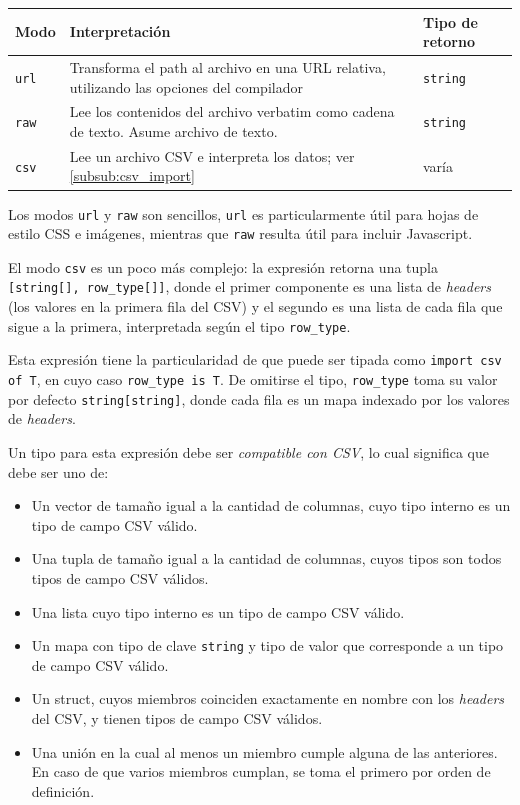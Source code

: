 \begin{table}[H]
\centering
\begin{tabularx}{\linewidth}{|l|>{\raggedright\arraybackslash}X|l|}
\hline
\textbf{Modo} & \textbf{Interpretación}                                                                   & \textbf{Tipo de retorno} \\ \hline
\texttt{url}  & Transforma el path al archivo en una URL relativa, utilizando las opciones del compilador & \texttt{string}          \\ \hline
\texttt{raw}  & Lee los contenidos del archivo verbatim como cadena de texto. Asume archivo de texto.     & \texttt{string}          \\ \hline
\texttt{csv}  & Lee un archivo CSV e interpreta los datos; ver \autoref{subsub:csv_import}                & varía                    \\ \hline
\end{tabularx}
\end{table}

Los modos \texttt{url} y \texttt{raw} son sencillos, \texttt{url} es particularmente útil para hojas de estilo CSS e imágenes, mientras que \texttt{raw} resulta útil para incluir Javascript.

El modo \texttt{csv} es un poco más complejo: la expresión retorna una tupla \texttt{[string[], row\_type[]]}, donde el primer componente es una lista de \textit{headers} (los valores en la primera fila del CSV) y el segundo es una lista de cada fila que sigue a la primera, interpretada según el tipo \texttt{row\_type}.

Esta expresión tiene la particularidad de que puede ser tipada como \texttt{import csv of T}, en cuyo caso \texttt{row\_type is T}. De omitirse el tipo, \texttt{row\_type} toma su valor por defecto \texttt{string[string]}, donde cada fila es un mapa indexado por los valores de \textit{headers}.

Un tipo para esta expresión debe ser \textit{compatible con CSV}, lo cual significa que debe ser uno de:

\begin{itemize}
	\item Un vector de tamaño igual a la cantidad de columnas, cuyo tipo interno es un tipo de campo CSV válido.
	\item Una tupla de tamaño igual a la cantidad de columnas, cuyos tipos son todos tipos de campo CSV válidos.
	\item Una lista cuyo tipo interno es un tipo de campo CSV válido.
	\item Un mapa con tipo de clave \texttt{string} y tipo de valor que corresponde a un tipo de campo CSV válido.
	\item Un struct, cuyos miembros coinciden exactamente en nombre con los \textit{headers} del CSV, y tienen tipos de campo CSV válidos.
	\item Una unión en la cual al menos un miembro cumple alguna de las anteriores. En caso de que varios miembros cumplan, se toma el primero por orden de definición.
\end{itemize}

